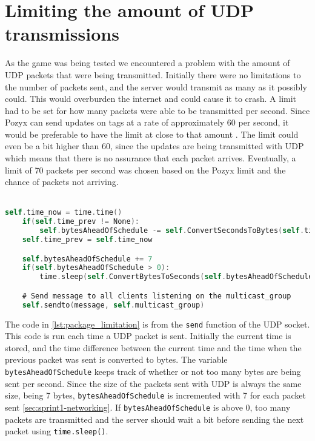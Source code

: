 \section{Limiting the amount of UDP transmissions}
As the game was being tested we encountered a problem with the amount of UDP packets that were being transmitted.
Initially there were no limitations to the number of packets sent, and the server would transmit as many as it possibly could.
This would overburden the internet and could cause it to crash.
A limit had to be set for how many packets were able to be transmitted per second.
Since Pozyx can send updates on tags at a rate of approximately 60 per second, it would be preferable to have the limit at close to that amount \cite{pozyx-Performance}.
The limit could even be a bit higher than 60, since the updates are being transmitted with UDP which means that there is no assurance that each packet arrives.
Eventually, a limit of 70 packets per second was chosen based on the Pozyx limit and the chance of packets not arriving.
\\\\
\begin{lstlisting}[caption={Implementaion of the limit on the amount of packets that can be sent per second}, captionpos=b,language=C,label={lst:package_limitation}]
    self.time_now = time.time()
    if(self.time_prev != None):
        self.bytesAheadOfSchedule -= self.ConvertSecondsToBytes(self.time_now - self.time_prev)
    self.time_prev = self.time_now

    self.bytesAheadOfSchedule += 7
    if(self.bytesAheadOfSchedule > 0):
        time.sleep(self.ConvertBytesToSeconds(self.bytesAheadOfSchedule))

    # Send message to all clients listening on the multicast_group
    self.sendto(message, self.multicast_group)
\end{lstlisting}
The code in \autoref{lst:package_limitation} is from the \texttt{send} function of the UDP socket.
This code is run each time a UDP packet is sent.
Initially the current time is stored, and the time difference between the current time and the time when the previous packet was sent is converted to bytes.
The variable \texttt{bytesAheadOfSchedule} keeps track of whether or not too many bytes are being sent per second.
Since the size of the packets sent with UDP is always the same size, being 7 bytes, \texttt{bytesAheadOfSchedule} is incremented with 7 for each packet sent \autoref{sec:sprint1-networking}.
If \texttt{bytesAheadOfSchedule} is above 0, too many packets are transmitted and the server should wait a bit before sending the next packet using \texttt{time.sleep()}.
